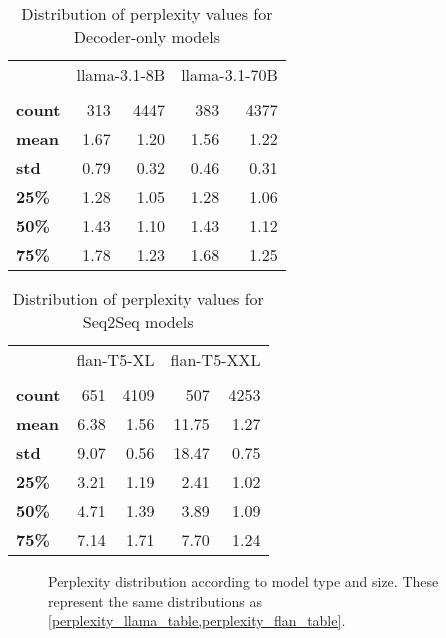 \begin{table}[ht]
	\centering
	\footnotesize
	\begin{tabular}{>{\bfseries}l | r r | r r}
		\toprule
			& \multicolumn{2}{|c}{\ttfamily llama-3.1-8B} & \multicolumn{2}{|c}{\ttfamily llama-3.1-70B} \\
			& \Parametric{} & \Contextual{} & \Parametric{} & \Contextual{} \\
		\midrule
			count &  313 & 4447 &  383 & 4377  \\
			mean  & 1.67 & 1.20 & 1.56 & 1.22  \\
			std   & 0.79 & 0.32 & 0.46 & 0.31  \\
			25\%  & 1.28 & 1.05 & 1.28 & 1.06  \\
			50\%  & 1.43 & 1.10 & 1.43 & 1.12  \\
			75\%  & 1.78 & 1.23 & 1.68 & 1.25  \\
		\bottomrule
	\end{tabular}
	\caption{Distribution of perplexity values for Decoder-only models}
	\label{perplexity_llama_table}
\end{table}

\begin{table}[ht]
	\centering
	\footnotesize
	\begin{tabular}{>{\bfseries}l | r r | r r}
		\toprule
			& \multicolumn{2}{|c}{\ttfamily flan-T5-XL} & \multicolumn{2}{|c}{\ttfamily flan-T5-XXL} \\
			& \Parametric{} & \Contextual{} & \Parametric{} & \Contextual{} \\
		\midrule
			count &  651 & 4109 &   507 & 4253 \\
			mean  & 6.38 & 1.56 & 11.75 & 1.27 \\
			std   & 9.07 & 0.56 & 18.47 & 0.75 \\
			25\%  & 3.21 & 1.19 &  2.41 & 1.02 \\
			50\%  & 4.71 & 1.39 &  3.89 & 1.09 \\
			75\%  & 7.14 & 1.71 &  7.70 & 1.24 \\
		\bottomrule
	\end{tabular}
	\caption{Distribution of perplexity values for Seq2Seq models}
	\label{perplexity_flan_table}
\end{table}

\begin{figure}[H]
	\centering
	\caption{Perplexity distribution according to model type and size. These represent the same distributions as \cref{perplexity_llama_table,perplexity_flan_table}.}
	\label{perplexity_results}
\end{figure}

